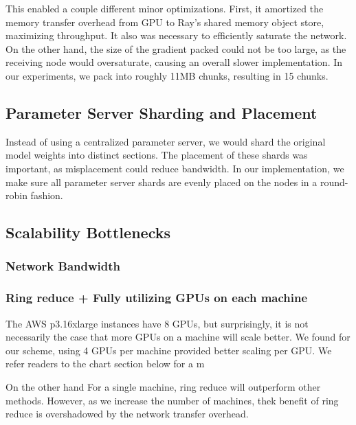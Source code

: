 This enabled a couple different minor optimizations. First, it amortized the memory transfer overhead from GPU to Ray's shared memory object store, maximizing throughput. It also was necessary to efficiently saturate the network. On the other hand, the size of the gradient packed could not be too large, as the receiving node would oversaturate, causing an overall slower implementation. In our experiments, we pack into roughly 11MB chunks, resulting in 15 chunks.

\subsection{Parameter Server Sharding and Placement}
Instead of using a centralized parameter server, we would shard the original model weights into distinct sections. The placement of these shards was important, as misplacement could reduce bandwidth. In our implementation, we make sure all parameter server shards are evenly placed on the nodes in a round-robin fashion.

\subsection{Scalability Bottlenecks}
\subsubsection{Network Bandwidth}


\subsubsection{Ring reduce + Fully utilizing GPUs on each machine}
The AWS p3.16xlarge instances have 8 GPUs, but surprisingly, it is not necessarily the case that more GPUs on a machine will scale better. We found for our scheme, using 4 GPUs per machine provided better scaling per GPU. We refer readers to the chart section below for a m

On the other hand For a single machine, ring reduce will outperform other methods. However, as we increase the number of machines, thek benefit of ring reduce is overshadowed by the network transfer overhead.
